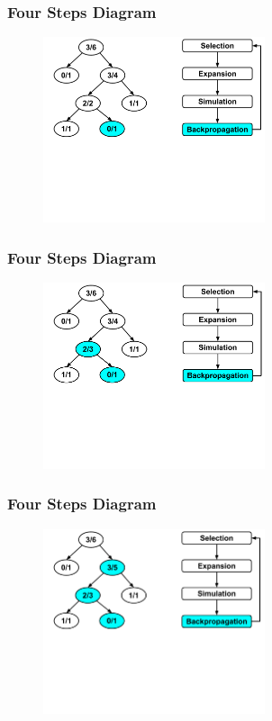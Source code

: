 \documentclass{beamer}
\begin{document}
\begin{frame}[fragile]
\frametitle{Four Steps Diagram}
\begin{figure}[h]
	\includegraphics[width=6.5cm]{Diagrams/MCTSShort/MCTSShortOneFourOne.pdf}
	\centering
\end{figure}
\end{frame}

\begin{frame}[fragile]
\frametitle{Four Steps Diagram}
\begin{figure}[h]
	\includegraphics[width=6.5cm]{Diagrams/MCTSShort/MCTSShortOneFourTwo.pdf}
	\centering
\end{figure}
\end{frame}

\begin{frame}[fragile]
\frametitle{Four Steps Diagram}
\begin{figure}[h]
	\includegraphics[width=6.5cm]{Diagrams/MCTSShort/MCTSShortOneFourThree.pdf}
	\centering
\end{figure}
\end{frame}
\end{document}
